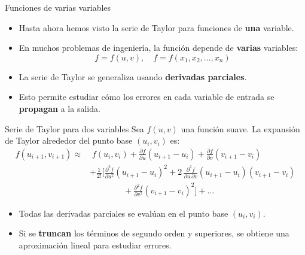 \documentclass[main.tex]{subfiles}
\begin{document}
\begin{frame}{Funciones de varias variables}
\small
\begin{itemize}
  \item Hasta ahora hemos visto la serie de Taylor para funciones de \textbf{una} variable.
  \item En muchos problemas de ingeniería, la función depende de \textbf{varias} variables:
  \[
    f = f(u,v),\quad f = f(x_1,x_2,\dots,x_n)
  \]
  \item La serie de Taylor se generaliza usando \textbf{derivadas parciales}.
  \item Esto permite estudiar cómo los errores en cada variable de entrada se \textbf{propagan} a la salida.
\end{itemize}
\end{frame}
\begin{frame}{Serie de Taylor para dos variables}
\small
Sea \(f(u,v)\) una función suave. La expansión de Taylor alrededor del punto base \((u_i,v_i)\) es:
\[
\begin{aligned}
f(u_{i+1},v_{i+1}) \approx{}&\; f(u_i,v_i)
+ \frac{\partial f}{\partial u}(u_{i+1}-u_i)
+ \frac{\partial f}{\partial v}(v_{i+1}-v_i) \\[4pt]
&+ \frac{1}{2!}\Bigg[
\frac{\partial^2 f}{\partial u^2}(u_{i+1}-u_i)^2
+ 2\,\frac{\partial^2 f}{\partial u\,\partial v}(u_{i+1}-u_i)(v_{i+1}-v_i) \\
&\qquad\qquad
+ \frac{\partial^2 f}{\partial v^2}(v_{i+1}-v_i)^2
\Bigg] + \dots
\end{aligned}
\]

\begin{itemize}
  \item Todas las derivadas parciales se evalúan en el punto base \((u_i,v_i)\).
  \item Si se \textbf{truncan} los términos de segundo orden y superiores, se obtiene una aproximación lineal para estudiar errores.
\end{itemize}
\end{frame}
\end{document}
